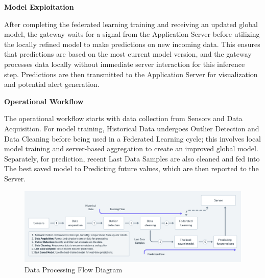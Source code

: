 \textbf{Model Exploitation}

After completing the federated learning training and receiving an updated global model, the gateway waits for a signal from the Application Server before utilizing the locally refined model to make predictions on new incoming data. This ensures that predictions are based on the most current model version, and the gateway processes data locally without immediate server interaction for this inference step. Predictions are then transmitted to the Application Server for visualization and potential alert generation.


\textbf{Operational Workflow}

The operational workflow starts with data collection from Sensors and Data Acquisition. For model training, Historical Data undergoes Outlier Detection and Data Cleaning before being used in a Federated Learning cycle; this involves local model training and server-based aggregation to create an improved global model. Separately, for prediction, recent Last Data Samples are also cleaned and fed into The best saved model to Predicting future values, which are then reported to the Server.
\begin{figure}[H]
    \centering
    \includegraphics[width=1\linewidth]{Figures/Data Workflow.png}
    \caption{Data Processing Flow Diagram}
    \label{fig:enter-label}
\end{figure}

